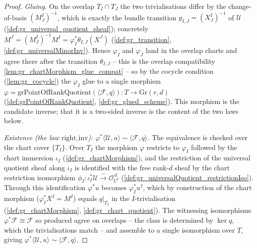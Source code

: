 \begin{proof}
  \emph{Gluing.} On the overlap \(T_I \cap T_J\) the two trivialisations differ by
  the change-of-basis \((M^I_J)^{-1}\), which is exactly the bundle transition
  \(g_{I,J} = (X^I_J)^{-1}\) of \(\mathcal{U}\)
  (\cref{def:gr_universal_quotient_sheaf}); concretely
  \(M^J = (M^I_J)^{-1} M^I = \varphi_I^{*}\theta_{I,J}(X^J)\)
  (\cref{def:gr_transition}, \cref{def:gr_universalMinorInv}). Hence
  \(\varphi_I\) and \(\varphi_J\) land in the overlap charts and agree there after
  the transition \(\theta_{I,J}\) -- this is the overlap compatibility
  \cref{lem:gr_chartMorphism_glue_compat} -- so by the cocycle condition
  (\cref{lem:gr_cocycle}) the \(\varphi_I\) glue to a single morphism
  \(\varphi = \mathrm{grPointOfRankQuotient}(\langle \mathcal{F}, q\rangle) :
  T \to \mathrm{Gr}(r,d)\) (\cref{def:grPointOfRankQuotient},
  \cref{def:gr_glued_scheme}). This morphism is the candidate inverse; that it
  is a two-sided inverse is the content of the two laws below.

  \emph{Existence (the law \(\mathrm{right\_inv}\)):
  \(\varphi^{*}\langle \mathcal{U}, u\rangle \sim \langle \mathcal{F}, q\rangle\).}
  The equivalence is checked over the chart cover \(\{T_I\}\). Over \(T_I\) the
  morphism \(\varphi\) restricts to \(\varphi_I\) followed by the chart immersion
  \(\iota_I\) (\cref{def:gr_chartMorphism}), and the restriction of the universal
  quotient sheaf along \(\iota_I\) is identified with the free rank-\(d\) sheaf by
  the chart restriction isomorphism
  \(\phi_I : \iota_I^{*}\mathcal{U} \xrightarrow{\sim} \mathcal{O}_{U^I}^{\,d}\)
  (\cref{def:gr_universalQuotient_restrictionIso}). Through this identification
  \(\varphi^{*}u\) becomes \(\varphi_I^{*}u^I\), which by construction of the chart
  morphism (\(\varphi_I^{*}X^I = M^I\)) equals \(q|_{T_I}\) in the
  \(I\)-trivialisation (\cref{def:gr_chartMorphism}, \cref{def:gr_chart_quotient}).
  The witnessing isomorphisms \(\varphi^{*}\mathcal{F} \cong \mathcal{F}\) so
  produced agree on overlaps -- the class is determined by \(\ker q\), which the
  trivialisations match -- and assemble to a single isomorphism over \(T\), giving
  \(\varphi^{*}\langle \mathcal{U}, u\rangle \sim \langle \mathcal{F}, q\rangle\).


\end{proof}
